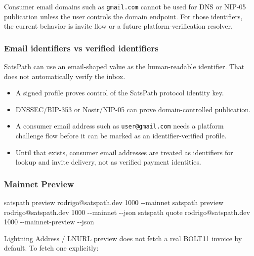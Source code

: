 \documentclass[
]{article}
\newenvironment{Shaded}{}{}
\newcommand{\AttributeTok}[1]{\textcolor[rgb]{0.49,0.56,0.16}{#1}}
\newcommand{\ExtensionTok}[1]{#1}
\newcommand{\NormalTok}[1]{#1}
\providecommand{\tightlist}{%
  \setlength{\itemsep}{0pt}\setlength{\parskip}{0pt}}
\begin{document}
Consumer email domains such as \texttt{gmail.com} cannot be used for DNS
or NIP-05 publication unless the user controls the domain endpoint. For
those identifiers, the current behavior is invite flow or a future
platform-verification resolver.

\hypertarget{email-identifiers-vs-verified-identifiers}{%
\subsubsection{Email identifiers vs verified
identifiers}\label{email-identifiers-vs-verified-identifiers}}

SatsPath can use an email-shaped value as the human-readable identifier.
That does not automatically verify the inbox.

\begin{itemize}
\tightlist
\item
  A signed profile proves control of the SatsPath protocol identity key.
\item
  DNSSEC/BIP-353 or Nostr/NIP-05 can prove domain-controlled
  publication.
\item
  A consumer email address such as \texttt{user@gmail.com} needs a
  platform challenge flow before it can be marked as an
  identifier-verified profile.
\item
  Until that exists, consumer email addresses are treated as identifiers
  for lookup and invite delivery, not as verified payment identities.
\end{itemize}

\hypertarget{mainnet-preview}{%
\subsubsection{Mainnet Preview}\label{mainnet-preview}}

\begin{Shaded}
\begin{Highlighting}[]
\ExtensionTok{satspath}\NormalTok{ preview rodrigo@satspath.dev 1000 }\AttributeTok{{-}{-}mainnet}
\ExtensionTok{satspath}\NormalTok{ preview rodrigo@satspath.dev 1000 }\AttributeTok{{-}{-}mainnet} \AttributeTok{{-}{-}json}
\ExtensionTok{satspath}\NormalTok{ quote rodrigo@satspath.dev 1000 }\AttributeTok{{-}{-}mainnet{-}preview} \AttributeTok{{-}{-}json}
\end{Highlighting}
\end{Shaded}

Lightning Address / LNURL preview does not fetch a real BOLT11 invoice
by default. To fetch one explicitly:
\end{document}
